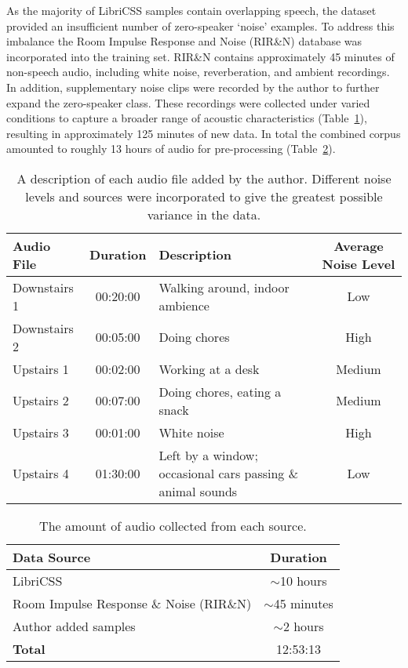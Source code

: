 As the majority of LibriCSS samples contain overlapping speech, the dataset provided an insufficient number of zero-speaker `noise' examples. To address this imbalance the Room Impulse Response and Noise (RIR\&N) database \cite{RoomImpulseResponseDatabase} was incorporated into the training set. RIR\&N contains approximately 45 minutes of non-speech audio, including white noise, reverberation, and ambient recordings. In addition, supplementary noise clips were recorded by the author to further expand the zero-speaker class. These recordings were collected under varied conditions to capture a broader range of acoustic characteristics (Table~\ref{tab:authordata}), resulting in approximately 125 minutes of new data. In total the combined corpus amounted to roughly 13 hours of audio for pre-processing (Table~\ref{tab:datacollection}).


\begin{table}[H]
  \centering
  \caption{A description of each audio file added by the author. Different noise levels and sources were incorporated to give the greatest possible variance in the data.}
  \label{tab:authordata}
  \begin{tabular}{|l|c|l|c|}
    \hline
    \textbf{Audio File} & \textbf{Duration} & \textbf{Description} & \textbf{Average Noise Level}  \\
    \hline
    Downstairs 1 & 00:20:00 & Walking around, indoor ambience & Low \\
    \hline
    Downstairs 2 & 00:05:00 & Doing chores & High \\
    \hline
    Upstairs 1 & 00:02:00 & Working at a desk & Medium \\
    \hline
    Upstairs 2 & 00:07:00 & Doing chores, eating a snack & Medium \\
    \hline
    Upstairs 3 & 00:01:00 & White noise & High \\
    \hline
    Upstairs 4 & 01:30:00 & Left by a window; occasional cars passing \& animal sounds & Low \\
    \hline
  \end{tabular}
\end{table}


\begin{table}[H]
  \centering
  \caption{The amount of audio collected from each source.}
  \label{tab:datacollection}
  \begin{tabular}{|l|c|}
    \hline
    \textbf{Data Source} & \textbf{Duration}  \\
    \hline
    LibriCSS & $\sim$10 hours \\
    \hline
    Room Impulse Response \& Noise (RIR\&N) & $\sim$45 minutes \\
    \hline
    Author added samples & $\sim$2 hours \\
    \hline
    \textbf{Total} & 12:53:13 \\
    \hline
  \end{tabular}
\end{table}

